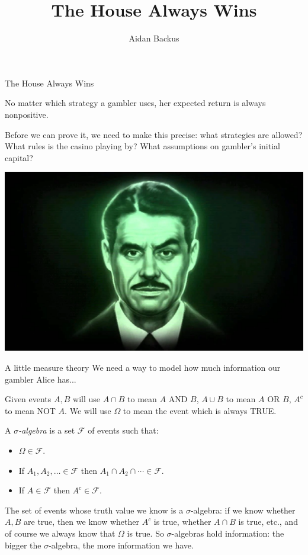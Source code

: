 \documentclass[10pt]{beamer}
\begin{document}
\title{The House Always Wins}
\author{Aidan Backus}
\begin{frame}
    \titlepage
\end{frame}

\begin{frame}{The House Always Wins}
\begin{theorem}
No matter which strategy a gambler uses, her expected return is always nonpositive.
\end{theorem}

Before we can prove it, we need to make this precise: what strategies are allowed? What rules is the casino playing by? What assumptions on gambler's initial capital?

\begin{center}
\includegraphics[scale=0.15]{Mr._House}
\end{center}
\end{frame}

\begin{frame}{A little measure theory}
We need a way to model how much information our gambler Alice has...

Given events $A, B$ will use $A \cap B$ to mean $A$ AND $B$, $A \cup B$ to mean $A$ OR $B$, $A^c$ to mean NOT $A$.
We will use $\Omega$ to mean the event which is always TRUE.

\begin{definition}
A \emph{$\sigma$-algebra} is a set $\mathcal F$ of events such that:
\begin{itemize}
\item $\Omega \in \mathcal F$.
\item If $A_1, A_2, \dots \in \mathcal F$ then $A_1 \cap A_2 \cap \cdots \in \mathcal F$.
\item If $A \in \mathcal F$ then $A^c \in \mathcal F$.
\end{itemize}
\end{definition}

The set of events whose truth value we know is a $\sigma$-algebra: if we know whether $A,B$ are true, then we know whether $A^c$ is true, whether $A \cap B$ is true, etc., and of course we always know that $\Omega$ is true. So $\sigma$-algebras hold information: the bigger the $\sigma$-algebra, the more information we have.
\end{frame}
\end{document}
